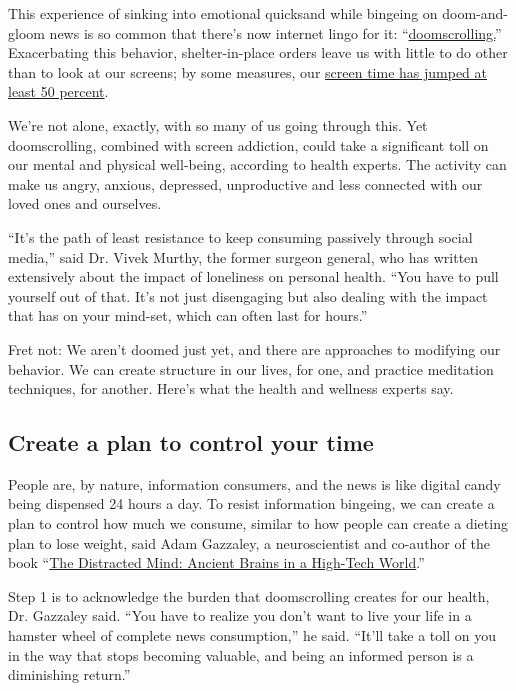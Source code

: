 This experience of sinking into emotional quicksand while bingeing on
doom-and-gloom news is so common that there's now internet lingo for it:
``\href{https://www.merriam-webster.com/words-at-play/doomsurfing-doomscrolling-words-were-watching}{doomscrolling.}''
Exacerbating this behavior, shelter-in-place orders leave us with little
to do other than to look at our screens; by some measures, our
\href{https://www.axios.com/kids-screen-time-coronavirus-562073f6-0638-47f2-8ea3-4f8781d6b31b.html}{screen
time has jumped at least 50 percent}.

We're not alone, exactly, with so many of us going through this. Yet
doomscrolling, combined with screen addiction, could take a significant
toll on our mental and physical well-being, according to health experts.
The activity can make us angry, anxious, depressed, unproductive and
less connected with our loved ones and ourselves.

``It's the path of least resistance to keep consuming passively through
social media,'' said Dr. Vivek Murthy, the former surgeon general, who
has written extensively about the impact of loneliness on personal
health. ``You have to pull yourself out of that. It's not just
disengaging but also dealing with the impact that has on your mind-set,
which can often last for hours.''

Fret not: We aren't doomed just yet, and there are approaches to
modifying our behavior. We can create structure in our lives, for one,
and practice meditation techniques, for another. Here's what the health
and wellness experts say.

\hypertarget{create-a-plan-to-control-your-time}{%
\subsection{Create a plan to control your
time}\label{create-a-plan-to-control-your-time}}

People are, by nature, information consumers, and the news is like
digital candy being dispensed 24 hours a day. To resist information
bingeing, we can create a plan to control how much we consume, similar
to how people can create a dieting plan to lose weight, said Adam
Gazzaley, a neuroscientist and co-author of the book
``\href{https://mitpress.mit.edu/books/distracted-mind}{The Distracted
Mind: Ancient Brains in a High-Tech World}.''

Step 1 is to acknowledge the burden that doomscrolling creates for our
health, Dr. Gazzaley said. ``You have to realize you don't want to live
your life in a hamster wheel of complete news consumption,'' he said.
``It'll take a toll on you in the way that stops becoming valuable, and
being an informed person is a diminishing return.''

